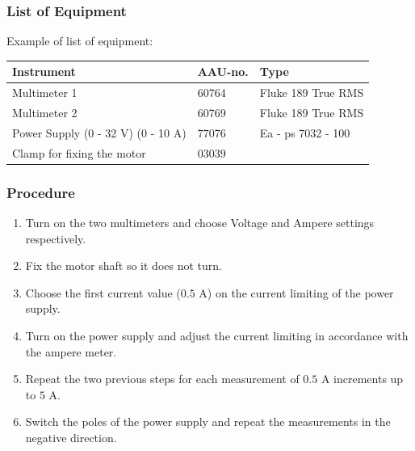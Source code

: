 \subsubsection{List of Equipment}
Example of list of equipment:
\begin{table}[H]
\begin{tabular}{|l|l|p{4cm}|}
\hline%
  \textbf{Instrument}                        &  \textbf{AAU-no.}  &  \textbf{Type}       \\
\hline%
  Multimeter 1                               &  60764             &  Fluke 189 True RMS  \\
\hline%
  Multimeter 2                   		         &  60769             &  Fluke 189 True RMS  \\
\hline%
  Power Supply \small{(0 - 32 V) (0 - 10 A)} &  77076             &  Ea - ps 7032 - 100  \\
\hline%
  Clamp for fixing the motor                 &  03039             &                      \\
\hline%
\end{tabular}
\end{table}

\subsubsection{Procedure}

\begin{enumerate}
  \item Turn on the two multimeters and choose Voltage and Ampere settings respectively.
  \item Fix the motor shaft so it does not turn.
  \item Choose the first current value ($0.5$ A) on the current limiting of the power supply.
  \item Turn on the power supply and adjust the current limiting in accordance with the ampere meter.
  \item Repeat the two previous steps for each measurement of $0.5$ A increments up to $5$ A.
  \item Switch the poles of the power supply and repeat the measurements in the negative direction.
\end{enumerate}


